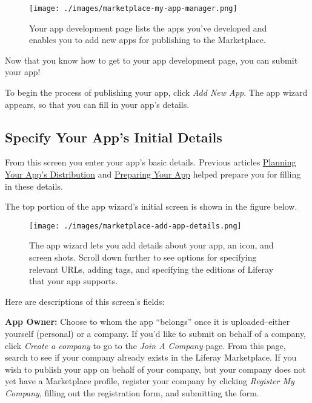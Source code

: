 \begin{figure}
\centering
\texttt{[image: ./images/marketplace-my-app-manager.png]}
\caption{Your app development page lists the apps you've developed and
enables you to add new apps for publishing to the Marketplace.}
\end{figure}

Now that you know how to get to your app development page, you can
submit your app!

To begin the process of publishing your app, click \emph{Add New App}.
The app wizard appears, so that you can fill in your app's details.

\subsection{Specify Your App's Initial
Details}\label{specify-your-apps-initial-details}

From this screen you enter your app's basic details. Previous articles
\href{/distribute/how-to-publish/-/knowledge_base/how-to-publish/planning-your-apps-distribution}{Planning
Your App's Distribution} and
\href{/distribute/how-to-publish/-/knowledge_base/how-to-publish/preparing-your-app}{Preparing
Your App} helped prepare you for filling in these details.

The top portion of the app wizard's initial screen is shown in the
figure below.

\begin{figure}
\centering
\texttt{[image: ./images/marketplace-add-app-details.png]}
\caption{The app wizard lets you add details about your app, an icon,
and screen shots. Scroll down further to see options for specifying
relevant URLs, adding tags, and specifying the editions of Liferay that
your app supports.}
\end{figure}

Here are descriptions of this screen's fields:

\textbf{App Owner:} Choose to whom the app ``belongs'' once it is
uploaded--either yourself (personal) or a company. If you'd like to
submit on behalf of a company, click \emph{Create a company} to go to
the \emph{Join A Company} page. From this page, search to see if your
company already exists in the Liferay Marketplace. If you wish to
publish your app on behalf of your company, but your company does not
yet have a Marketplace profile, register your company by clicking
\emph{Register My Company}, filling out the registration form, and
submitting the form.

